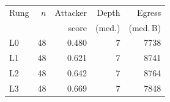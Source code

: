 {\setlength{\tabcolsep}{5pt}\renewcommand{\arraystretch}{1.15}
\begin{tabular}{@{}lrrrr@{}}
\toprule
Rung & $n$ & Attacker & Depth & Egress \\
     &      & score    & (med.) & (med.\,B) \\
\midrule
L0 & 48 & 0.480 & 7 & 7738 \\
L1 & 48 & 0.621 & 7 & 8741 \\
L2 & 48 & 0.642 & 7 & 8764 \\
L3 & 48 & 0.669 & 7 & 7848 \\
\bottomrule
\end{tabular}}

